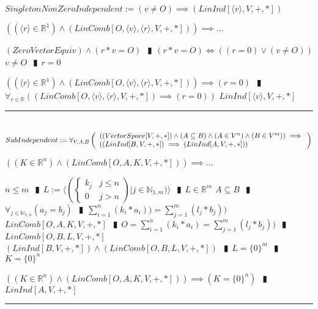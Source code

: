 \documentclass{book}
\newcommand{\abr}{:=}
\newcommand{\pipe}{$\phantom{(}\vrectangleblack\phantom{)}$}
\begin{document}
$SingletonNonZeroIndependent \abr (v \neq O) \implies (LinInd[\langle v \rangle, V, +, *])$
\begin{enumerate}
  \lit $((\langle r \rangle \in \mathbb{R}^1) \land (LinComb[O, \langle v \rangle , \langle r \rangle, V, +, *])) \implies \ldots$
  \begin{enumerate}
    \lit $(ZeroVectorEquiv) \land (r * v = O)$ \pipe $(r * v = O) \iff ((r = 0) \lor (v \neq O))$
    \lit $v \neq O$ \pipe $r = 0$
  \end{enumerate}
  \lit $((\langle r \rangle \in \mathbb{R}^1) \land (LinComb[O, \langle v \rangle , \langle r \rangle, V, +, *])) \implies (r = 0)$ \pipe $\forall_{r \in \mathbb{R}}((LinComb[O, \langle v \rangle, \langle r \rangle, V, +, *]) \implies (r = 0))$
  \lit $LinInd[\langle v \rangle, V, +, *]$
\end{enumerate} \vspace{.75mm} \hrule \vspace{.75mm} \ \\ 

$SubIndependent \abr \forall_{V, A, B}\left(\begin{array}{ll}
  ((VectorSpace[V, +, *]) \land (A \subseteq B) \land (A \in V^n) \land (B \in V^m)) \hfill \implies \hfill \\
  ((LinInd[B, V, +, *]) \implies (LinInd[A, V, +, *]))
\end{array}\right)$
\begin{enumerate}
  \lit $((K \in \mathbb{R}^n) \land (LinComb[O, A, K, V, +, *])) \implies \ldots$
  \begin{enumerate}
    \lit $n \leq m$ \pipe $L \abr \langle \left(\begin{cases} 
      k_j & j \leq n \\
      0 & j > n 
    \end{cases}\right) | j \in \mathbb{N}_{1, m}) \rangle$ \pipe $L \in \mathbb{R}^m$
    \lit $A \subseteq B$ \pipe $\forall_{j \in \mathbb{N}_{1, n}}(a_j = b_j)$ \pipe $\sum_{i = 1}^{n}(k_i * a_i)) = \sum_{j = 1}^{m}(l_j * b_j))$
    \lit $LinComb[O, A, K, V, +, *]$ \pipe $O = \sum_{i = 1}^{n}(k_i * a_i) = \sum_{j = 1}^{m}(l_j * b_j))$ \pipe $LinComb[O, B, L, V, +, *]$
    \lit $(LinInd[B, V, +, *]) \land (LinComb[O, B, L, V, +, *])$ \pipe $L = \{0\}^m$ \pipe $K = \{0\}^n$ 
  \end{enumerate}
  \lit $((K \in \mathbb{R}^n) \land (LinComb[O, A, K, V, +, *])) \implies (K = \{0\}^n)$ \pipe $LinInd[A, V, +, *]$
\end{enumerate} \vspace{.75mm} \hrule \vspace{.75mm} \ \\ 
\end{document}

